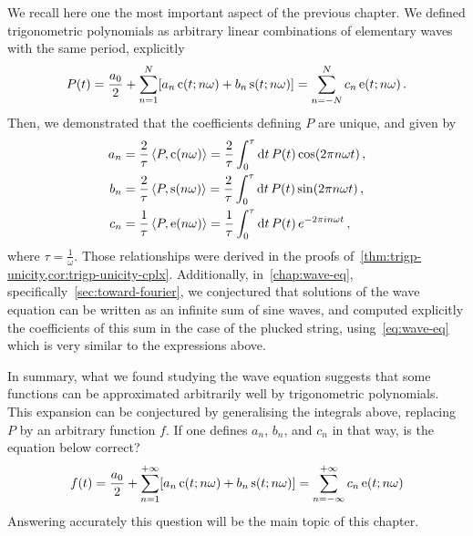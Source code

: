 We recall here one the most important aspect of the previous chapter. We defined
trigonometric polynomials as arbitrary linear combinations of elementary waves with the
same period, explicitly
\begin{equation}
	P(t)=\frac{a_0}{2}+\sum_{n=1}^N[a_n\operatorname{c}(t;n\omega)+b_n\operatorname{s}(t;n\omega)]=
	\sum_{n=-N}^{N}c_n\operatorname{e}(t;n\omega)\,.
\end{equation}
Then, we demonstrated that the coefficients defining $P$ are unique, and given by
\begin{align}
	a_n & =\frac{2}{\tau}\braket{P,\operatorname{c}(n\omega)}
	=\frac{2}{\tau}\int_0^{\tau}\mathrm{d} t\,P(t)\cos(2\pi n\omega t)\,,
	\label{eq:series-an-intro}                   \\
	b_n & =\frac{2}{\tau}\braket{P,\operatorname{s}(n\omega)}
	=\frac{2}{\tau}\int_0^{\tau}\mathrm{d} t\,P(t)\sin(2\pi n\omega t)\,,
	\label{eq:series-bn-intro}                   \\
	c_n & =\frac{1}{\tau}\braket{P,\operatorname{e}(n\omega)}
	=\frac{1}{\tau}\int_0^{\tau}\mathrm{d} t\,P(t)\,e^{-2\pi i n\omega t}\,,
	\label{eq:series-cn-intro}
\end{align}
where $\tau=\frac{1}{\omega}$. Those relationships were derived in the proofs
of~\cref{thm:trigp-unicity,cor:trigp-unicity-cplx}. Additionally, in~\cref{chap:wave-eq},
specifically~\cref{sec:toward-fourier}, we conjectured that solutions of the wave equation
can be written as an infinite sum of sine waves, and computed explicitly the coefficients
of this sum in the case of the plucked string, using~\cref{eq:wave-eq} which is very
similar to the expressions above.

In summary, what we found studying the wave equation suggests that some functions can be
approximated arbitrarily well by trigonometric polynomials. This expansion can be
conjectured by generalising the integrals above, replacing $P$ by an arbitrary function
$f$. If one defines $a_n$, $b_n$, and $c_n$ in that way, is the equation below correct?
\begin{equation}
	f(t)=\frac{a_0}{2}+\sum_{n=1}^{+\infty}[a_n\operatorname{c}(t;n\omega)+b_n\operatorname{s}(t;n\omega)]=
	\sum_{n=-\infty}^{+\infty}c_n\operatorname{e}(t;n\omega)
\end{equation}
Answering accurately this question will be the main topic of this chapter.
